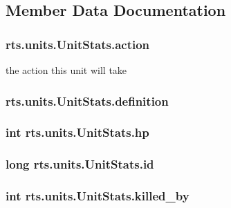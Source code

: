 \subsection{Member Data Documentation}
\hypertarget{classrts_1_1units_1_1_unit_stats_a6720d11613b18a874df2c36e689a950d}{
\subsubsection[{action}]{ {\bf rts.units.UnitStats.action}}}
\label{classrts_1_1units_1_1_unit_stats_a6720d11613b18a874df2c36e689a950d}
the action this unit will take \hypertarget{classrts_1_1units_1_1_unit_stats_a72276bc3c68668477d551b03f9237552}{
\subsubsection[{definition}]{ {\bf rts.units.UnitStats.definition}}}
\label{classrts_1_1units_1_1_unit_stats_a72276bc3c68668477d551b03f9237552}
\hypertarget{classrts_1_1units_1_1_unit_stats_ae6dbed9342232ad0c30a1ee809aee548}{
\subsubsection[{hp}]{\setlength{\rightskip}{0pt plus 5cm}int {\bf rts.units.UnitStats.hp}}}
\label{classrts_1_1units_1_1_unit_stats_ae6dbed9342232ad0c30a1ee809aee548}
\hypertarget{classrts_1_1units_1_1_unit_stats_a2a17d4f66adec0d70c02ff56f57dcdc0}{
\subsubsection[{id}]{\setlength{\rightskip}{0pt plus 5cm}long {\bf rts.units.UnitStats.id}}}
\label{classrts_1_1units_1_1_unit_stats_a2a17d4f66adec0d70c02ff56f57dcdc0}
\hypertarget{classrts_1_1units_1_1_unit_stats_a7c136510fe6631fcfd9bd246698328d3}{
\subsubsection[{killed\_\-by}]{\setlength{\rightskip}{0pt plus 5cm}int {\bf rts.units.UnitStats.killed\_\-by}}}

